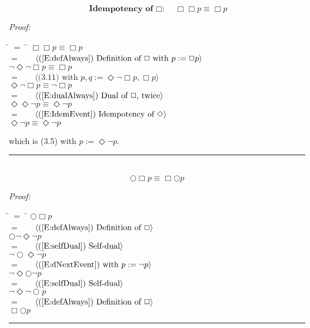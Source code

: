 \documentclass[fleqn, leqno]{article}
\newcommand{\lgap}{2pt}                             %
\newcommand{\mymathindent}{24pt}                      %
\newcommand{\myqed}{\hfill\rule[-.23ex]{1.2ex}{2.0ex}}
\newcommand{\Gll} {\langle}                         %
\newcommand{\Ggg} {\rangle}                         %
\newcommand{\Hint}[1]     {\ \ \ $\Gll              \mbox{#1} \Ggg$ }   %
\begin{document}
\begin{equation}\label{E:IdemAlways}
\textbf{Idempotency of $\Box$:}\quad \Box\Box p \equiv \Box p
\end{equation}

\emph{Proof:}
\begin{tabbing}
\hspace{\mymathindent} \= $= \;$ \= \kill
  \> \>   $\Box\Box p \equiv \Box p$\\[\lgap]
  \> $=$  \>  \Hint{(\ref{E:defAlways}) Definition of $\Box$ with $p := \Box p$}\\[\lgap]
  \> \>   $\lnot\Diamond\lnot\Box p \equiv \Box p$\\[\lgap]
  \> $=$  \>  \Hint{(3.11) with $p,q := \Diamond\lnot\Box p, \Box p$}\\[\lgap]
  \> \>   $\Diamond\lnot\Box p \equiv \lnot\Box p$\\[\lgap]
  \> $=$  \>  \Hint{(\ref{E:dualAlways}) Dual of $\Box$, twice}\\[\lgap]
  \> \>   $\Diamond\Diamond\lnot p \equiv \Diamond\lnot p$\\[\lgap]
  \> $=$  \>  \Hint{(\ref{E:IdemEvent}) Idempotency of $\Diamond$}\\[\lgap]
  \> \>   $\Diamond\lnot p \equiv \Diamond\lnot p$\\[\lgap]
\end{tabbing}
which is (3.5) with $p := \Diamond\lnot p$. \myqed\\[\lgap]


\begin{equation}\label{E:dNextAlways}
\bigcirc\Box p \equiv \Box\bigcirc p
\end{equation}

\emph{Proof:}
\begin{tabbing}
\hspace{\mymathindent} \= $= \;$ \= \kill
  \> \>   $\bigcirc\Box p$\\[\lgap]
  \> $=$  \>  \Hint{(\ref{E:defAlways}) Definition of $\Box$}\\[\lgap]
  \> \>   $\bigcirc\lnot\Diamond\lnot p$\\[\lgap]
  \> $=$  \>  \Hint{(\ref{E:selfDual}) Self-dual}\\[\lgap]
  \> \>   $\lnot\bigcirc\Diamond\lnot p$\\[\lgap]
  \> $=$  \>  \Hint{(\ref{E:dNextEvent}) with $p := \lnot p$}\\[\lgap]
  \> \>   $\lnot\Diamond\bigcirc\lnot p$\\[\lgap]
  \> $=$  \>  \Hint{(\ref{E:selfDual}) Self-dual}\\[\lgap]
  \> \>   $\lnot\Diamond\lnot\bigcirc p$\\[\lgap]
  \> $=$  \>  \Hint{(\ref{E:defAlways}) Definition of $\Box$}\\[\lgap]
  \> \>   $\Box\bigcirc p$\\[\lgap]
\end{tabbing}
\myqed\\[\lgap]
\end{document}
